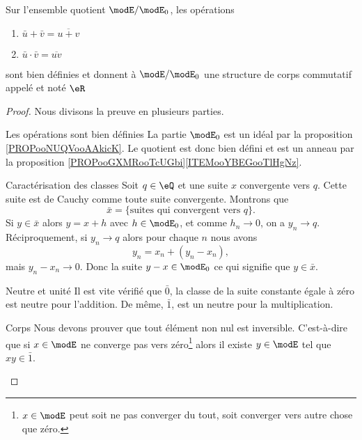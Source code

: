 \begin{theoremDef}       \label{DefooFKYKooOngSCB}
	Sur l'ensemble quotient \( \modE/\modE_0\), les opérations
	\begin{enumerate}
		\item
		      \( \bar u+\bar v=\overline{ u+v }\)
		\item
		      \( \bar u\cdot \bar v=\overline{ uv }\)
	\end{enumerate}
	sont bien définies et donnent à \( \modE/\modE_0\) une structure de corps commutatif appelé  et noté \( \eR\)
\end{theoremDef}

\begin{proof}
	Nous divisons la preuve en plusieurs parties.
	\begin{subproof}
		\item[Les opérations sont bien définies]
		La partie \( \modE_0\) est un idéal par la proposition \ref{PROPooNUQVooAAkicK}. Le quotient est donc bien défini et est un anneau par la proposition \ref{PROPooGXMRooTcUGbi}\ref{ITEMooYBEGooTlHgNz}.
		\item[Caractérisation des classes]
		Soit \( q\in \eQ\) et une suite \( x\) convergente vers \( q\). Cette suite est de Cauchy comme toute suite convergente. Montrons que
		\begin{equation}
			\bar x=\{ \text{suites qui convergent vers } q \}.
		\end{equation}
		Si \( y\in\bar x\) alors \( y=x+h\) avec \( h\in \modE_0\), et comme \( h_n\to 0\), on a \( y_n\to q\). Réciproquement, si \( y_n\to q\) alors pour chaque \( n\) nous avons
		\begin{equation}
			y_n=x_n+(y_n-x_n),
		\end{equation}
		mais \( y_n-x_n\to 0\). Donc la suite \( y-x\in\modE_0\) ce qui signifie que \( y\in\bar x\).
		\item[Neutre et unité]
		Il est vite vérifié que \( \bar 0\), la classe de la suite constante égale à zéro est neutre pour l'addition. De même, \( \bar 1\), est un neutre pour la multiplication.
		\item[Corps]
		Nous devons prouver que tout élément non nul est inversible. C'est-à-dire que si \( x\in\modE\) ne converge pas vers zéro\footnote{\( x\in\modE\) peut soit ne pas converger du tout, soit converger vers autre chose que zéro.} alors il existe \( y\in \modE\) tel que \( xy\in\bar 1\).


\end{subproof}
\end{proof}

